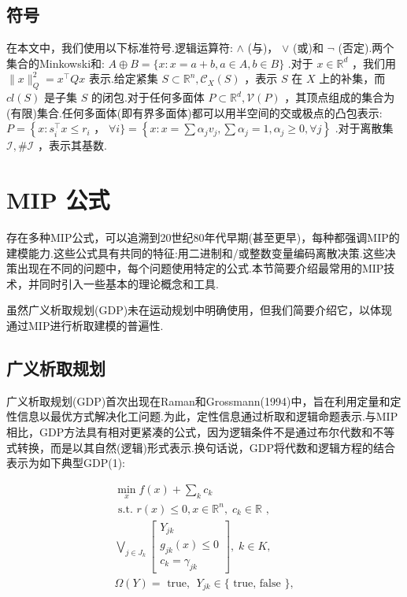 \documentclass[10pt]{article}
\begin{document}
\subsection{符号}

在本文中，我们使用以下标准符号.逻辑运算符: \(\land\) (与)， \(\vee\) (或)和 \(\neg\) (否定).两个集合的Minkowski和: \(A \oplus  B = \{ x : x = a + b,a \in  A,b \in  B\}\) .对于 \(x \in  {\mathbb{R}}^{d}\) ，我们用 \(\parallel x{\parallel }_{Q}^{2} = {x}^{\top }{Qx}\) 表示.给定紧集 \(S \subset  {\mathbb{R}}^{n},{\mathcal{C}}_{X}\left( S\right)\) ，表示 \(S\) 在 \(X\) 上的补集，而 \({cl}\left( S\right)\) 是子集 \(S\) 的闭包.对于任何多面体 \(P \subset  {\mathbb{R}}^{d},\mathcal{V}\left( P\right)\) ，其顶点组成的集合为(有限)集合.任何多面体(即有界多面体)都可以用半空间的交或极点的凸包表示: \(P = \left\{  {x : {s}_{i}^{\top }x \leq  {r}_{i}}\right.\) ， \(\forall i\}  = \left\{  {x : x = \sum {\alpha }_{j}{v}_{j},\sum {\alpha }_{j} = 1,{\alpha }_{j} \geq  0,\forall j}\right\}\) .对于离散集 \(\mathcal{I},\# \mathcal{I}\) ，表示其基数.

\section{MIP 公式}

存在多种MIP公式，可以追溯到20世纪80年代早期(甚至更早)，每种都强调MIP的建模能力.这些公式具有共同的特征:用二进制和/或整数变量编码离散决策.这些决策出现在不同的问题中，每个问题使用特定的公式.本节简要介绍最常用的MIP技术，并同时引入一些基本的理论概念和工具.

虽然广义析取规划(GDP)未在运动规划中明确使用，但我们简要介绍它，以体现通过MIP进行析取建模的普遍性.

\subsection{广义析取规划}

广义析取规划(GDP)首次出现在Raman和Grossmann(1994)中，旨在利用定量和定性信息以最优方式解决化工问题.为此，定性信息通过析取和逻辑命题表示.与MIP相比，GDP方法具有相对更紧凑的公式，因为逻辑条件不是通过布尔代数和不等式转换，而是以其自然(逻辑)形式表示.换句话说，GDP将代数和逻辑方程的结合表示为如下典型GDP(1):

\begin{subequations}
  \begin{gather}
    \mathop{\min }\limits_{x}f\left( x\right)  + \mathop{\sum }\limits_{k}{c}_{k} \\
    \text{ s.t. }r\left( x\right)  \leq  0,x \in  {\mathbb{R}}^{n},\;{c}_{k} \in  \mathbb{R}\text{ , } \\
    \mathop{\bigvee }\limits_{{j \in  {J}_{k}}}\left\lbrack  \begin{matrix} {Y}_{jk} \\  {g}_{jk}\left( x\right)  \leq  0 \\  {c}_{k} = {\gamma }_{jk} \end{matrix}\right\rbrack  ,\;k \in  K,\\
    \Omega \left( Y\right)  = \text{ true, }\;{Y}_{jk} \in  \{ \text{ true, false }\} ,\\
  \end{gather}
\end{subequations}
\end{document}
